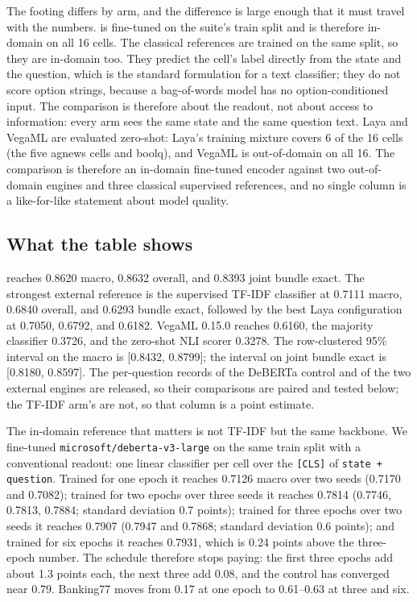 The footing differs by arm, and the difference is large enough that it must travel with the
numbers. \vsix{} is fine-tuned on the suite's train split and is therefore in-domain on all 16
cells. The classical references are trained on the same split, so they are in-domain too. They predict
the cell's label directly from the state and the question, which is the standard formulation for a
text classifier; they do not score option strings, because a bag-of-words model has no
option-conditioned input. The comparison is therefore about the readout, not about access to
information: every arm sees the same state and the same question text.
Laya and VegaML are evaluated zero-shot: Laya's training mixture covers 6 of the 16 cells (the
five agnews cells and boolq), and VegaML is out-of-domain on all 16. The comparison is therefore
an in-domain fine-tuned encoder against two out-of-domain engines and three classical supervised
references, and no single column is a like-for-like statement about model quality.

\subsection{What the table shows}
\vsix{} reaches 0.8620 macro, 0.8632 overall, and 0.8393 joint bundle exact. The strongest
external reference is the supervised TF-IDF classifier at 0.7111 macro, 0.6840 overall, and
0.6293 bundle exact, followed by the best Laya configuration at 0.7050, 0.6792, and 0.6182.
VegaML 0.15.0 reaches 0.6160, the majority classifier 0.3726, and the zero-shot NLI scorer 0.3278.
The row-clustered 95\% interval on the \vsix{} macro is [0.8432, 0.8799]; the interval on joint
bundle exact is [0.8180, 0.8597]. The per-question records of the DeBERTa control and of the two
external engines are released, so their comparisons are paired and tested below; the TF-IDF arm's
are not, so that column is a point estimate.

The in-domain reference that matters is not TF-IDF but the same backbone. We fine-tuned
\texttt{microsoft/deberta-v3-large} on the same train split with a conventional readout: one linear
classifier per cell over the \texttt{[CLS]} of \texttt{state + question}. Trained for one epoch it reaches 0.7126 macro over two seeds (0.7170 and 0.7082); trained for two
epochs over three seeds it reaches 0.7814 (0.7746, 0.7813, 0.7884; standard deviation 0.7 points);
trained for three epochs over two seeds it reaches 0.7907 (0.7947 and 0.7868; standard deviation 0.6
points); and trained for six epochs it reaches 0.7931, which is 0.24 points above the three-epoch
number. The schedule therefore stops paying: the first three epochs add about 1.3 points each, the
next three add 0.08, and the control has converged near 0.79. Banking77 moves from 0.17 at one epoch
to 0.61--0.63 at three and six.

